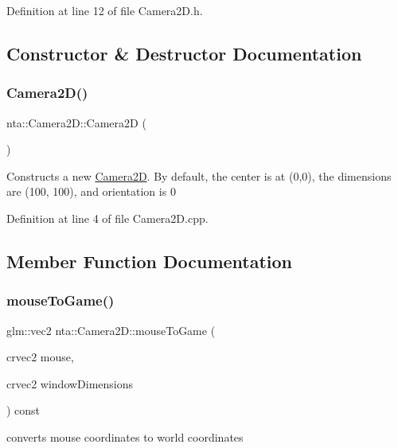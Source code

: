 Definition at line 12 of file Camera2\+D.\+h.



\subsection{Constructor \& Destructor Documentation}
\mbox{\label{classnta_1_1Camera2D_a11aada3f997c594ade11dd3c46d826f4}} 
\subsubsection{\texorpdfstring{Camera2\+D()}{Camera2D()}}
{\footnotesize\ttfamily nta\+::\+Camera2\+D\+::\+Camera2D (\begin{DoxyParamCaption}{ }\end{DoxyParamCaption})}

Constructs a new \hyperlink{classnta_1_1Camera2D}{Camera2D}. By default, the center is at (0,0), the dimensions are (100, 100), and orientation is 0 

Definition at line 4 of file Camera2\+D.\+cpp.



\subsection{Member Function Documentation}
\mbox{\label{classnta_1_1Camera2D_afb20fb9823724babdc8d18b17336169c}} 
\subsubsection{\texorpdfstring{mouse\+To\+Game()}{mouseToGame()}}
{\footnotesize\ttfamily glm\+::vec2 nta\+::\+Camera2\+D\+::mouse\+To\+Game (\begin{DoxyParamCaption}\item[{crvec2}]{mouse,  }\item[{crvec2}]{window\+Dimensions }\end{DoxyParamCaption}) const}



converts mouse coordinates to world coordinates 

